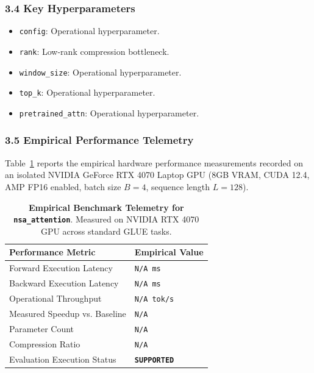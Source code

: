 \subsubsection*{3.4 Key Hyperparameters}
\begin{itemize}
    \item \texttt{config}: Operational hyperparameter.
    \item \texttt{rank}: Low-rank compression bottleneck.
    \item \texttt{window\_size}: Operational hyperparameter.
    \item \texttt{top\_k}: Operational hyperparameter.
    \item \texttt{pretrained\_attn}: Operational hyperparameter.
\end{itemize}

\subsubsection*{3.5 Empirical Performance Telemetry}
Table~\ref{tab:telemetry_nsa\_attention} reports the empirical hardware performance measurements recorded on an isolated NVIDIA GeForce RTX 4070 Laptop GPU (8GB VRAM, CUDA 12.4, AMP FP16 enabled, batch size $B=4$, sequence length $L=128$).

\begin{table}[h]
\centering
\small
\caption{\textbf{Empirical Benchmark Telemetry for \texttt{nsa\_attention}}. Measured on NVIDIA RTX 4070 GPU across standard GLUE tasks.}
\label{tab:telemetry_nsa\_attention}
\begin{tabularx}{\columnwidth}{lX}
\toprule
\textbf{Performance Metric} & \textbf{Empirical Value} \\
\midrule
Forward Execution Latency & \texttt{N/A ms} \\
Backward Execution Latency & \texttt{N/A ms} \\
Operational Throughput & \texttt{N/A tok/s} \\
Measured Speedup vs. Baseline & \texttt{N/A} \\
Parameter Count & \texttt{N/A} \\
Compression Ratio & \texttt{N/A} \\
Evaluation Execution Status & \textbf{\texttt{SUPPORTED}} \\
\bottomrule
\end{tabularx}
\end{table}

